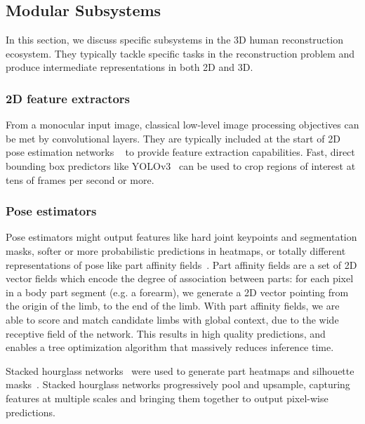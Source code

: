 \documentclass[9pt,twocolumn]{article}
\begin{document}
{	\subsection{Modular Subsystems}

	\par{In this section, we discuss specific subsystems in the 3D human reconstruction ecosystem. They typically tackle
	specific tasks in the reconstruction problem and produce intermediate representations in both 2D and 3D.}

		\subsubsection{2D feature extractors}

			\par{From a monocular input image, classical low-level image processing objectives can be met by convolutional
			layers. They are typically included at the start of 2D pose estimation networks
			~\cite{openpose-paf,openpose-cpm,nbf} to provide feature extraction capabilities. Fast, direct bounding box
			predictors like YOLOv3~\cite{yolo3} can be used to crop regions of interest at tens of frames per second or more.}\\
 
		\subsubsection{Pose estimators}

			\par{Pose estimators might output features like hard joint keypoints and segmentation masks, softer or more
			probabilistic predictions in heatmaps, or totally different representations of pose like part affinity fields~\cite{openpose-paf}.
			Part affinity fields are a set of 2D vector fields which encode the degree of association between parts: for each
			pixel in a body part segment (e.g. a forearm), we generate a 2D vector pointing from the origin of the limb, to the
			end of the limb. With part affinity fields, we are able to score and match candidate limbs with global context, due
			to the wide receptive field of the network. This results in high quality predictions, and enables a tree optimization
			algorithm that massively reduces inference time.}\\

			\par{Stacked hourglass networks~\cite{hourglass} were used to generate part heatmaps and silhouette masks~\cite{humanshape}.
			Stacked hourglass networks progressively pool and upsample, capturing features at multiple scales and bringing them
			together to output pixel-wise predictions.}

}
\end{document}
